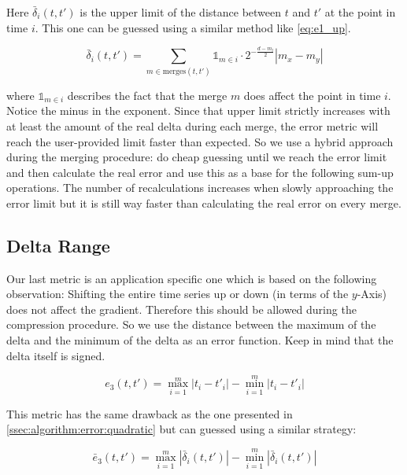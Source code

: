 Here $\bar{\delta}_i(t, t')$ is the upper limit of the distance between $t$ and $t'$ at the point in time $i$. This one can be guessed using a similar method like \autoref{eq:e1_up}.

\begin{equation}\label{eq:delta_up}
    \bar{\delta}_i\left(t, t'\right) = \sum_{m \in \mathrm{merges}(t, t')} \mathbb{1}_{m \in i} \cdot 2^{-\frac{d - m_l}{2}} \left|m_x - m_y\right|
\end{equation}

where $\mathbb{1}_{m \in i}$ describes the fact that the merge $m$ does affect the point in time $i$. Notice the minus in the exponent. Since that upper limit strictly increases with at least the amount of the real delta during each merge, the error metric will reach the user-provided limit faster than expected. So we use a hybrid approach during the merging procedure: do cheap guessing until we reach the error limit and then calculate the real error and use this as a base for the following sum-up operations. The number of recalculations increases when slowly approaching the error limit but it is still way faster than calculating the real error on every merge.


\subsection{Delta Range}
\label{ssec:algorithm:error:range}

Our last metric is an application specific one which is based on the following observation: Shifting the entire time series up or down (in terms of the $y$-Axis) does not affect the gradient. Therefore this should be allowed during the compression procedure. So we use the distance between the maximum of the delta and the minimum of the delta as an error function. Keep in mind that the delta itself is signed.

\begin{equation}\label{eq:e3}
    e_3\left(t, t'\right) = \max_{i=1}^m \left|t_i - t'_i\right| - \min_{i=1}^m \left|t_i - t'_i\right|
\end{equation}

This metric has the same drawback as the one presented in \autoref{ssec:algorithm:error:quadratic} but can guessed using a similar strategy:

\begin{equation}\label{eq:e3_up}
    \bar{e}_3\left(t, t'\right) = \max_{i=1}^m \left|\bar{\delta}_i(t, t')\right| - \min_{i=1}^m \left|\bar{\delta}_i(t, t')\right|
\end{equation}



